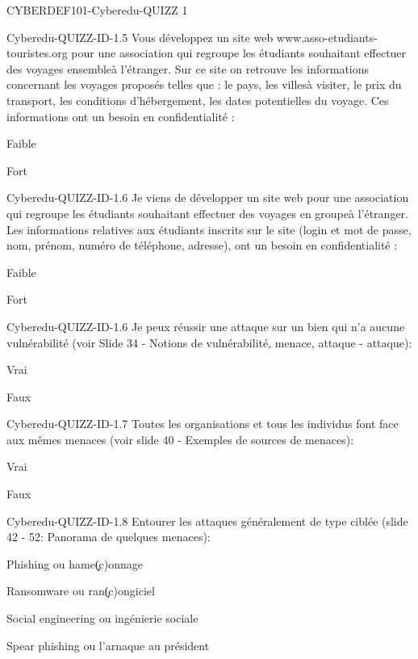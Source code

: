 \documentclass[12pt]{article}
\begin{document}
\begin{quiz}{CYBERDEF101-Cyberedu-QUIZZ 1}
\begin{multi}[multiple=true]{Cyberedu-QUIZZ-ID-1.5}
	Vous d\'eveloppez un site web www.asso-etudiants-touristes.org  pour une association qui regroupe les \'etudiants souhaitant effectuer des voyages ensemble\`a l'\'etranger. Sur ce site on retrouve les informations concernant les voyages propos\'es telles que : le pays, les villes\`a visiter, le prix du transport, les conditions d'h\'ebergement, les dates potentielles du voyage. Ces informations ont un besoin en confidentialit\'e :
\item* 	Faible
\item 	Fort
\end{multi}

\begin{multi}[multiple=true]{Cyberedu-QUIZZ-ID-1.6}
	Je viens de d\'evelopper un site web pour une association qui regroupe les \'etudiants souhaitant effectuer des voyages en groupe\`a l'\'etranger. Les informations relatives aux \'etudiants inscrits sur le site (login et mot de passe, nom, pr\'enom, num\'ero de t\'el\'ephone, adresse), ont un besoin en confidentialit\'e :
\item 	Faible
\item* 	Fort
\end{multi}

\begin{multi}[multiple=true]{Cyberedu-QUIZZ-ID-1.6}
	Je peux r\'eussir une attaque sur un bien qui n'a aucune vuln\'erabilit\'e (voir Slide 34 - Notions de vuln\'erabilit\'e, menace, attaque - attaque):
\item 	Vrai
\item* 	Faux
\end{multi}

\begin{multi}[multiple=true]{Cyberedu-QUIZZ-ID-1.7}
	Toutes les organisations et tous les individus font face aux m\^emes menaces (voir slide 40 - Exemples de sources de menaces):
\item 	Vrai
\item* 	Faux
\end{multi}

\begin{multi}[multiple=true]{Cyberedu-QUIZZ-ID-1.8}
	Entourer les attaques g\'en\'eralement de type  cibl\'ee (slide 42 - 52: Panorama de quelques menaces):
\item 	Phishing ou hame\c(c)onnage
\item 	Ransomware ou ran\c(c)ongiciel
\item* 	Social engineering ou ing\'enierie sociale
\item* 	Spear phishing ou l'arnaque au pr\'esident
\end{multi}


\end{quiz}
\end{document}
